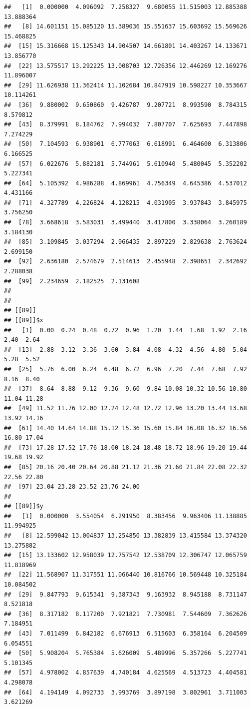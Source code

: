 \documentclass[
  ignorenonframetext,
]{beamer}
\begin{document}
\begin{frame}[fragile]{}
\begin{verbatim}
##   [1]  0.000000  4.096092  7.258327  9.680055 11.515003 12.885388 13.888364
##   [8] 14.601151 15.085120 15.389036 15.551637 15.603692 15.569626 15.468825
##  [15] 15.316668 15.125343 14.904507 14.661801 14.403267 14.133671 13.856770
##  [22] 13.575517 13.292225 13.008703 12.726356 12.446269 12.169276 11.896007
##  [29] 11.626938 11.362414 11.102684 10.847919 10.598227 10.353667 10.114261
##  [36]  9.880002  9.650860  9.426787  9.207721  8.993590  8.784315  8.579812
##  [43]  8.379991  8.184762  7.994032  7.807707  7.625693  7.447898  7.274229
##  [50]  7.104593  6.938901  6.777063  6.618991  6.464600  6.313806  6.166525
##  [57]  6.022676  5.882181  5.744961  5.610940  5.480045  5.352202  5.227341
##  [64]  5.105392  4.986288  4.869961  4.756349  4.645386  4.537012  4.431166
##  [71]  4.327789  4.226824  4.128215  4.031905  3.937843  3.845975  3.756250
##  [78]  3.668618  3.583031  3.499440  3.417800  3.338064  3.260189  3.184130
##  [85]  3.109845  3.037294  2.966435  2.897229  2.829638  2.763624  2.699150
##  [92]  2.636180  2.574679  2.514613  2.455948  2.398651  2.342692  2.288038
##  [99]  2.234659  2.182525  2.131608
## 
## 
## [[89]]
## [[89]]$x
##   [1]  0.00  0.24  0.48  0.72  0.96  1.20  1.44  1.68  1.92  2.16  2.40  2.64
##  [13]  2.88  3.12  3.36  3.60  3.84  4.08  4.32  4.56  4.80  5.04  5.28  5.52
##  [25]  5.76  6.00  6.24  6.48  6.72  6.96  7.20  7.44  7.68  7.92  8.16  8.40
##  [37]  8.64  8.88  9.12  9.36  9.60  9.84 10.08 10.32 10.56 10.80 11.04 11.28
##  [49] 11.52 11.76 12.00 12.24 12.48 12.72 12.96 13.20 13.44 13.68 13.92 14.16
##  [61] 14.40 14.64 14.88 15.12 15.36 15.60 15.84 16.08 16.32 16.56 16.80 17.04
##  [73] 17.28 17.52 17.76 18.00 18.24 18.48 18.72 18.96 19.20 19.44 19.68 19.92
##  [85] 20.16 20.40 20.64 20.88 21.12 21.36 21.60 21.84 22.08 22.32 22.56 22.80
##  [97] 23.04 23.28 23.52 23.76 24.00
## 
## [[89]]$y
##   [1]  0.000000  3.554054  6.291950  8.383456  9.963406 11.138885 11.994925
##   [8] 12.599042 13.004837 13.254850 13.382839 13.415584 13.374320 13.275882
##  [15] 13.133602 12.958039 12.757542 12.538709 12.306747 12.065759 11.818969
##  [22] 11.568907 11.317551 11.066440 10.816766 10.569448 10.325184 10.084502
##  [29]  9.847793  9.615341  9.387343  9.163932  8.945188  8.731147  8.521818
##  [36]  8.317182  8.117200  7.921821  7.730981  7.544609  7.362626  7.184951
##  [43]  7.011499  6.842182  6.676913  6.515603  6.358164  6.204509  6.054551
##  [50]  5.908204  5.765384  5.626009  5.489996  5.357266  5.227741  5.101345
##  [57]  4.978002  4.857639  4.740184  4.625569  4.513723  4.404581  4.298078
##  [64]  4.194149  4.092733  3.993769  3.897198  3.802961  3.711003  3.621269

\end{verbatim}
\end{frame}
\end{document}
